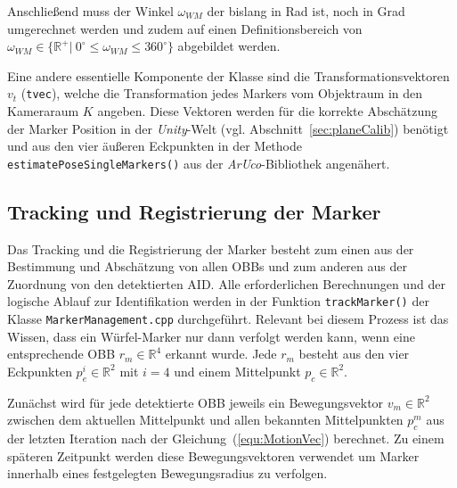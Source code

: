 Anschließend muss der Winkel $\omega_{WM}$ der bislang in Rad ist, noch in Grad umgerechnet werden und zudem auf einen Definitionsbereich von $\omega_{WM} \in \{\mathbb{R}^+ |\ 0 ^\circ \le \omega_{WM} \le 360^\circ\}$ abgebildet werden.


Eine andere essentielle Komponente der Klasse sind die Transformationsvektoren $v_t$ (\texttt{tvec}), welche die Transformation jedes Markers vom Objektraum in den Kameraraum $K$ angeben. Diese Vektoren werden für die korrekte Abschätzung der Marker Position in der \textit{Unity}-Welt (vgl. Abschnitt~\ref{sec:planeCalib}) benötigt und aus den vier äußeren Eckpunkten in der Methode \texttt{estimate\-Pose\-Single\-Markers()} aus der \textit{ArUco}-Bibliothek angenähert. 

\subsection{Tracking und Registrierung der Marker}\label{sec:trackAndReg}%
Das Tracking und die Registrierung der Marker besteht zum einen aus der Bestimmung und Abschätzung von allen OBBs und zum anderen aus der Zuordnung von den detektierten AID. Alle erforderlichen Berechnungen und der logische Ablauf zur Identifikation werden in der Funktion \texttt{track\-Marker()} der Klasse \texttt{Marker\-Management.cpp} durchgeführt. Relevant bei diesem Prozess ist das Wissen, dass ein Würfel-Marker nur dann verfolgt werden kann, wenn eine entsprechende OBB $r_m \in \mathbb{R}^4$ erkannt wurde. Jede $r_m$ besteht aus den vier Eckpunkten $p_e^i \in \mathbb{R}^2$ mit $i=4$ und einem Mittelpunkt $p_c \in \mathbb{R}^2$.

Zunächst wird für jede detektierte OBB jeweils ein Bewegungsvektor $v_m \in \mathbb{R}^2$ zwischen dem aktuellen Mittelpunkt und allen bekannten Mittelpunkten $p_c^{m}$ aus der letzten Iteration nach der Gleichung~(\ref{equ:MotionVec}) berechnet. Zu einem späteren Zeitpunkt werden diese Bewegungsvektoren verwendet um Marker innerhalb eines festgelegten Bewegungsradius zu verfolgen. 


